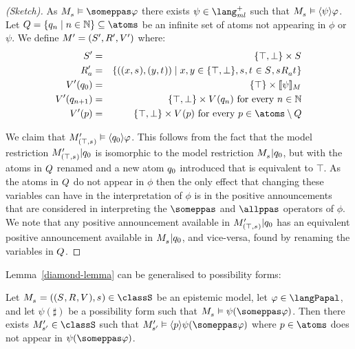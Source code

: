 \begin{proof}[(Sketch)]
As $\kPModel{\kStateS} \entails \someppas \phi$ there exists $\psi \in \langMlPlus$ such that $\kPModel{\kStateS} \entails \announceE{\psi} \phi$.
Let $\atomsQ = \{\atomQ_n \mid n \in \naturals\} \subseteq \atoms$ be an infinite set of atoms not appearing in $\phi$ or $\psi$.
We define $\kModelAndTuple[\prime]$ where:
\begin{eqnarray*}
    \kStates[\prime] &=& \{\top, \bot\} \times \kStates\\
    \kAccessibility[\prime]{\agentA} &=& \{((x, \kStateS), (y, \kStateT)) \mid x, y \in \{\top, \bot\}, \kStateS, \kStateT \in \kStates, \kStateS \kAccessibility{\agentA} \kStateT \}\\
    \kValuation[\prime](\atomQ_0) &=& \{\top\} \times \interpretation[\kModel]{\psi}\\
    \kValuation[\prime](\atomQ_{n + 1}) &=&  \{\top, \bot\} \times \kValuation(\atomQ_n) \text{ for every } n \in \naturals\\
    \kValuation[\prime](\atomP) &=& \{\top, \bot\} \times \kValuation(\atomP) \text{ for every } \atomP \in \atoms \setminus \atomsQ
\end{eqnarray*}

We claim that $\kPModel[\prime]{(\top, \kStateS)} \entails \announceE{\atomQ_0} \phi$.
This follows from the fact that the model restriction $\restrict{\kPModel[\prime]{(\top, \kStateS)}}{\atomQ_0}$ is isomorphic to the model restriction $\restrict{\kPModel{\kStateS}}{\atomQ_0}$, but with the atoms in $Q$ renamed and a new atom $q_0$ introduced that is equivalent to $\top$.
As the atoms in $Q$ do not appear in $\phi$ then the only effect that changing these variables can have in the interpretation of $\phi$ is in the positive announcements that are considered in interpreting the $\someppas$ and $\allppas$ operators of $\phi$.
We note that any positive announcement available in $\restrict{\kPModel[\prime]{(\top, \kStateS)}}{\atomQ_0}$ has an equivalent positive announcement available in $\restrict{\kPModel{\kStateS}}{\atomQ_0}$, and vice-versa, found by renaming the variables in $Q$.
\end{proof}

Lemma~\ref{diamond-lemma} can be generalised to possibility forms:

\begin{lemma}\label{possibility-lemma}
Let $\kPModelAndTuple{\kStateS} \in \classS$ be an epistemic model,
let $\phi \in \langPapal$, and
let $\psi(\sharp)$ be a possibility form such that $\kPModel{\kStateS} \entails \psi(\someppas \phi)$.
Then there exists $\kPModel[\prime]{\kStateS[\prime]} \in \classS$ such that $\kPModel[\prime]{\kStateS[\prime]} \entails \announceE{\atomP} \psi(\someppas \phi)$ where $\atomP \in \atoms$ does not appear in $\psi(\someppas \phi)$.
\end{lemma}

